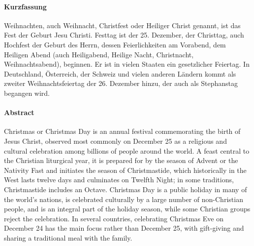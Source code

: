 \cleardoublepage
\thispagestyle{plain}

\paragraph{Kurzfassung}
Weihnachten, auch Weihnacht, Christfest oder Heiliger Christ genannt, ist das Fest der Geburt Jesu Christi. Festtag ist der 25. Dezember, der Christtag, auch Hochfest der Geburt des Herrn, dessen Feierlichkeiten am Vorabend, dem Heiligen Abend (auch Heiligabend, Heilige Nacht, Christnacht, Weihnachtsabend), beginnen. Er ist in vielen Staaten ein gesetzlicher Feiertag. In Deutschland, Österreich, der Schweiz und vielen anderen Ländern kommt als zweiter Weihnachtsfeiertag der 26. Dezember hinzu, der auch als Stephanstag begangen wird.

\cleardoublepage
\thispagestyle{plain}



\paragraph{Abstract} Christmas or Christmas Day is an annual festival commemorating the birth of Jesus Christ, observed most commonly on December 25 as a religious and cultural celebration among billions of people around the world. A feast central to the Christian liturgical year, it is prepared for by the season of Advent or the Nativity Fast and initiates the season of Christmastide, which historically in the West lasts twelve days and culminates on Twelfth Night; in some traditions, Christmastide includes an Octave. Christmas Day is a public holiday in many of the world's nations, is celebrated culturally by a large number of non-Christian people, and is an integral part of the holiday season, while some Christian groups reject the celebration. In several countries, celebrating Christmas Eve on December 24 has the main focus rather than December 25, with gift-giving and sharing a traditional meal with the family.
